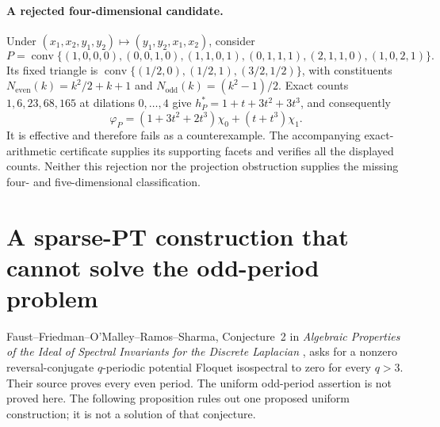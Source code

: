 \documentclass[11pt,a4paper]{article}
\theoremstyle{definition}\newtheorem{definition}[theorem]{Definition}
\theoremstyle{remark}\newtheorem{remark}[theorem]{Remark}
\begin{document}
\paragraph{A rejected four-dimensional candidate.}
Under $(x_1,x_2,y_1,y_2)\mapsto(y_1,y_2,x_1,x_2)$, consider
\[
 P=\operatorname{conv}\{(1,0,0,0),(0,0,1,0),(1,1,0,1),
              (0,1,1,1),(2,1,1,0),(1,0,2,1)\}.
\]
Its fixed triangle is
$\operatorname{conv}\{(1/2,0),(1/2,1),(3/2,1/2)\}$, with constituents
$N_{\mathrm{even}}(k)=k^2/2+k+1$ and
$N_{\mathrm{odd}}(k)=(k^2-1)/2$.
Exact counts $1,6,23,68,165$ at dilations $0,\ldots,4$ give
$h^*_P=1+t+3t^2+3t^3$, and consequently
\[
 \varphi_P=(1+3t^2+2t^3)\chi_0+(t+t^3)\chi_1.
\]
It is effective and therefore fails as a counterexample. The accompanying
exact-arithmetic certificate supplies its supporting facets and verifies
all the displayed counts. Neither this rejection nor the projection
obstruction supplies the missing four- and five-dimensional classification.

\section{A sparse-PT construction that cannot solve the odd-period problem}

Faust--Friedman--O'Malley--Ramos--Sharma, Conjecture~2 in
\emph{Algebraic Properties of the Ideal of Spectral Invariants for the
Discrete Laplacian} \cite{Faust26}, asks for a nonzero reversal-conjugate
$q$-periodic potential Floquet isospectral to zero for every $q>3$.
Their source proves every even period. The uniform odd-period assertion
is not proved here. The following proposition rules out one proposed
uniform construction; it is not a solution of that conjecture.
\end{document}
